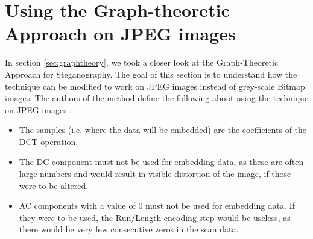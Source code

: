 \section{Using the Graph-theoretic Approach on JPEG images}
\label{sec:graphJPEG}
In section \ref{sec:graphtheory}, we took a closer look at the Graph-Theoretic Approach for Steganography. 
The goal of this section is to understand how the technique can be modified to work on JPEG images instead of grey-scale Bitmap images. 
The authors of the method define the following about using the technique on JPEG images \citep{hetzl_2005}:

\begin{itemize}
    \item The samples (i.e. 
    where the data will be embedded) are the coefficients of the DCT operation. 
    \item The DC component must not be used for embedding data, as these are often large numbers and would result in visible distortion of the image, if those were to be altered.
    \item AC components with a value of 0 must not be used for embedding data.
    If they were to be used, the Run/Length encoding step would be useless, as there would be very few consecutive zeros in the scan data.
\end{itemize}

